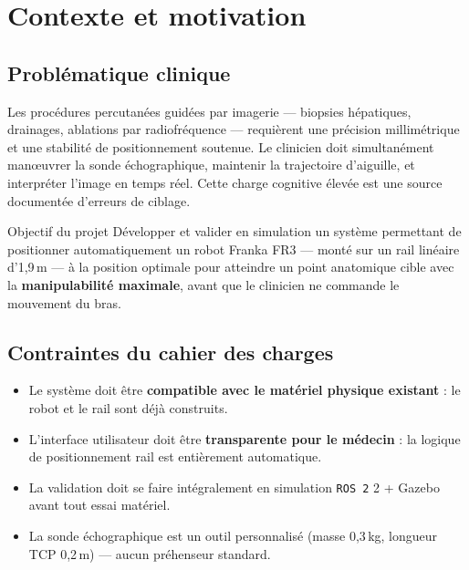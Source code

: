\documentclass[11pt, a4paper]{article}
\newcommand{\ros}{\texttt{ROS\,2}}
\newcommand{\FR}{FR3}
\begin{document}
\pagecolor{white}
\color{black}

\newpage
\tableofcontents
\newpage

\section{Contexte et motivation}

\subsection{Problématique clinique}

Les procédures percutanées guidées par imagerie — biopsies hépatiques, drainages, ablations par radiofréquence — requièrent une précision millimétrique et une stabilité de positionnement soutenue. Le clinicien doit simultanément manœuvrer la sonde échographique, maintenir la trajectoire d'aiguille, et interpréter l'image en temps réel. Cette charge cognitive élevée est une source documentée d'erreurs de ciblage.

\begin{keybox}{Objectif du projet}
Développer et valider en simulation un système permettant de positionner automatiquement un robot Franka \FR{} — monté sur un rail linéaire d'1,9\,m — à la position optimale pour atteindre un point anatomique cible avec la \textbf{manipulabilité maximale}, avant que le clinicien ne commande le mouvement du bras.
\end{keybox}

\subsection{Contraintes du cahier des charges}

\begin{itemize}[leftmargin=2em, itemsep=3pt]
  \item Le système doit être \textbf{compatible avec le matériel physique existant} : le robot et le rail sont déjà construits.
  \item L'interface utilisateur doit être \textbf{transparente pour le médecin} : la logique de positionnement rail est entièrement automatique.
  \item La validation doit se faire intégralement en simulation \ros{} 2 + Gazebo avant tout essai matériel.
  \item La sonde échographique est un outil personnalisé (masse 0,3\,kg, longueur TCP 0,2\,m) — aucun préhenseur standard.
\end{itemize}
\end{document}
